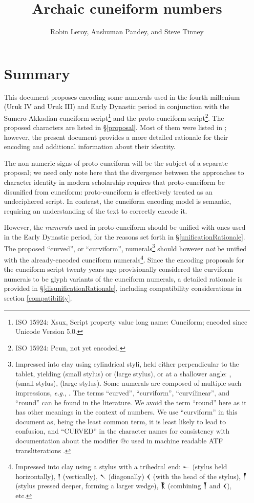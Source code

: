 \documentclass[10pt, a4paper, twoside]{article}
\title{Archaic cuneiform numbers}
\author{Robin Leroy, Anshuman Pandey, and Steve Tinney}
\newcommand\oneAšC{{\proposalfont\symbol{"12550}}} %
\newcommand\oneDišC{{\proposalfont\symbol{"12559}}}
\newcommand\oneUC{{\proposalfont\symbol{"12562}}}
\newcommand\oneŊešTwoC{{\proposalfont\symbol{"1256B}}}
\newcommand\oneŊešʾuC{{\proposalfont\symbol{"12574}}}
\newcommand\oneŠarTwoC{{\proposalfont\symbol{"12579}}}
\newcommand\oneŠarʾuC{{\proposalfont\symbol{"12582}}}
\newcommand{\exempligratia}{\emph{e.g.}}
\begin{document}
\maketitle

\tableofcontents

\section{Summary}

This document proposes encoding some numerals used in the fourth millenium (Uruk IV and Uruk III) and Early Dynastic period in conjunction
with the Sumero-Akkadian cuneiform script\footnote{ISO 15924: Xsux, Script property value long name: Cuneiform; encoded since Unicode Version 5.0.}
and the proto-cuneiform script\footnote{ISO 15924: Pcun, not yet encoded.}.
The proposed characters are listed in §\ref{proposal}.
Most of them were listed in \cite{L2/23-190}; however,
the present document provides a more detailed rationale for their encoding
and additional information about their identity.

The non-numeric signs of proto-cuneiform will be the subject of a separate proposal;
we need only note here that the divergence between the approaches to character identity
in modern scholarship requires that proto-cuneiform be disunified from cuneiform:
proto-cuneiform is effectively treated as an undeciphered script.
In contrast, the cuneiform encoding model is semantic,
requiring an understanding of the text to correctly encode it.

However, the \emph{numerals} used in proto-cuneiform should be unified with
ones used in the Early Dynastic period, for the reasons set forth in
§\ref{unificationRationale}.
The proposed ``curved'', or ``curviform'', numerals\footnote{%
Impressed into clay using cylindrical styli,
held either perpendicular to the tablet, yielding
\oneUC{} (small stylus) or
\oneŠarTwoC{} (large stylus),
or at a shallower angle:
\oneAšC, \oneDišC{} (small stylus),
\oneŊešTwoC{} (large stylus).
Some numerals are composed of multiple such impressions,
\exempligratia, \oneŊešʾuC.
The terms ``curved'', ``curviform'', ``curvilinear'', and ``round''
can be found in the literature.
We avoid the term ``round'' here as it has other meanings
in the context of numbers.
We use ``curviform'' in this document as, being the least
common term, it is least likely to lead to confusion,
and ``CURVED'' in the character names for consistency
with documentation about the modifier @c used in machine
readable ATF transliterations \cite{inlineATF}.}
should however \emph{not} be unified with
the already-encoded cuneiform numerals\footnote{%
Impressed into clay using a stylus with a trihedral end:
{\xsuxfont 𒀸} (stylus held horizontally),
{\xsuxfont 𒁹} (vertically),
{\xsuxfont 𒀹} (diagonally)
{\xsuxfont 𒌋} (with the head of the stylus),
{\xsuxfont 𒐕} (stylus pressed deeper, forming a larger wedge),
{\xsuxfont 𒐞} (combining {\xsuxfont 𒐕} and {\xsuxfont 𒌋}), etc.}.
Since the encoding proposals for the cuneiform script
twenty years ago provisionally considered the curviform numerals
to be glyph variants of the cuneiform numerals,
a detailed rationale is provided in §\ref{disunificationRationale},
including compatibility considerations in section \ref{compatibility}.
\end{document}
